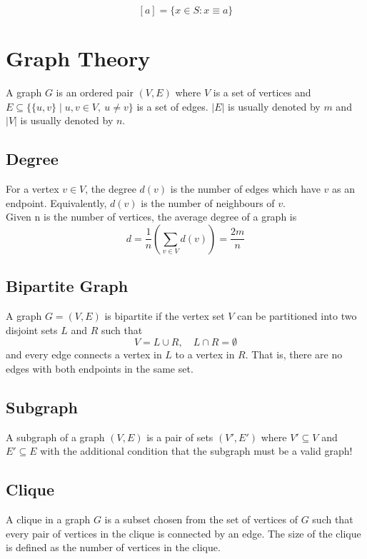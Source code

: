 \[
[a]=\{x\in S:x\equiv a\}
\]

\section{Graph Theory}

A graph $G$ is an ordered pair $(V,E)$ where \(V\) is a set of vertices 
and \(E\subseteq \{\{u,v\}\mid u,v\in V,\ u\neq v\}\) is a set of edges.
$|E|$ is usually denoted by \(m\) and $|V|$ is usually denoted by \(n\).
\subsection{Degree}

For a vertex \(v\in V\), the degree \(d(v)\) is the number of edges which have \(v\) as an endpoint. 
Equivalently, \(d(v)\) is the number of neighbours of \(v\).\\

\noindent Given n is the number of vertices, the average degree 
of a graph is
\[
d=\frac{1}{n}\left(\sum_{v\in V} d(v)\right)=\frac{2m}{n}
\]

\subsection{Bipartite Graph}

A graph \(G=(V,E)\) is bipartite if the vertex set \(V\) can be partitioned into two disjoint sets \(L\) and \(R\) such that
\[
V=L\cup R,\quad L\cap R=\emptyset
\]
and every edge connects a vertex in \(L\) to a vertex in \(R\). That is, there are no edges with both endpoints in the same set.

\subsection{Subgraph}
\label{subgraph}
A subgraph of a graph $(V,E)$ is a pair of sets $(V',E')$ where \(V'\subseteq V\) and \(E'\subseteq E\) with the 
additional condition that the subgraph must be a valid graph!


\subsection{Clique}
\label{clique}
A clique in a graph $G$ is a subset chosen from the set of vertices of $G$ such that 
every pair of vertices in the clique is connected by an edge. The size of the clique is 
defined as the number of vertices in the clique.



